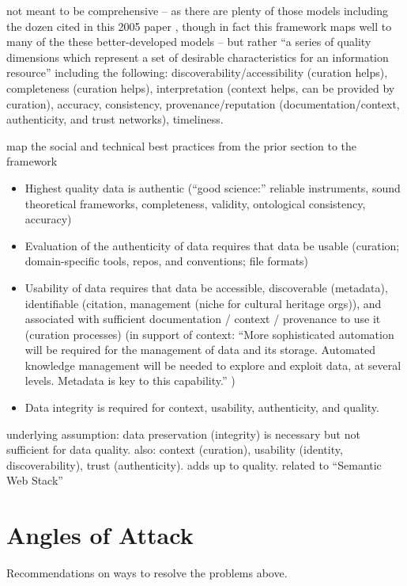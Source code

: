 \documentclass{acm_proc_article-sp}
\begin{document}
not meant to be comprehensive -- as there are plenty of those models
including the dozen cited in this 2005 paper \cite{knight:quality},
though in fact this framework maps well to many of the these
better-developed models -- but rather ``a series of quality dimensions
which represent a set of desirable characteristics for an information
resource'' \cite{curry:community} including the following:
discoverability/accessibility (curation helps), completeness (curation
helps), interpretation (context helps, can be provided by curation),
accuracy, consistency, provenance/reputation (documentation/context,
authenticity, and trust networks), timeliness.

map the social and technical best practices from the prior section to
the framework

\begin{itemize}
\item Highest quality data is authentic (``good science:'' reliable
  instruments, sound theoretical frameworks, completeness, validity,
  ontological consistency, accuracy)
\item Evaluation of the authenticity of data requires that data be usable
  (curation; domain-specific tools, repos, and conventions; file formats)
\item Usability of data requires that data be accessible, discoverable
  (metadata), identifiable (citation, management (niche for cultural
  heritage orgs)), and associated with sufficient documentation /
  context / provenance to use it (curation processes) (in support of
  context: ``More sophisticated automation will be required for the
  management of data and its storage. Automated knowledge management
  will be needed to explore and exploit data, at several
  levels. Metadata is key to this capability.'' \cite{jisc:deluge})
\item Data integrity is required for context, usability, authenticity, and
  quality.
\end{itemize}

underlying assumption: data preservation (integrity) is necessary but not
sufficient for data quality. also: context (curation), usability (identity,
discoverability), trust (authenticity). adds up to quality. related to
``Semantic Web Stack''

\section{Angles of Attack}
Recommendations on ways to resolve the problems above.
\end{document}
